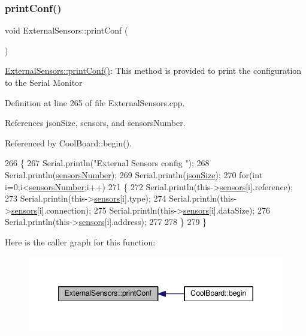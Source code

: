 \subsubsection{\texorpdfstring{print\+Conf()}{printConf()}}
{\footnotesize\ttfamily void External\+Sensors\+::print\+Conf (\begin{DoxyParamCaption}{ }\end{DoxyParamCaption})}

\hyperlink{classExternalSensors_a78c2bf55084435dd51d3c559b2d3c6f3}{External\+Sensors\+::print\+Conf()}\+: This method is provided to print the configuration to the Serial Monitor 

Definition at line 265 of file External\+Sensors.\+cpp.



References json\+Size, sensors, and sensors\+Number.



Referenced by Cool\+Board\+::begin().


\begin{DoxyCode}
266 \{
267     Serial.println(\textcolor{stringliteral}{"External Sensors config "});
268     Serial.println(\hyperlink{classExternalSensors_a58e4fbf9adeae787d92be5fa33043b5d}{sensorsNumber});
269     Serial.println(\hyperlink{classExternalSensors_acacea86d74d967b57fcff282d26cff57}{jsonSize});
270     \textcolor{keywordflow}{for}(\textcolor{keywordtype}{int} i=0;i<\hyperlink{classExternalSensors_a58e4fbf9adeae787d92be5fa33043b5d}{sensorsNumber};i++)
271     \{
272         Serial.println(this->\hyperlink{classExternalSensors_a284233f884fcf00154a44740cf1d9e1e}{sensors}[i].reference);
273         Serial.println(this->\hyperlink{classExternalSensors_a284233f884fcf00154a44740cf1d9e1e}{sensors}[i].type);
274         Serial.println(this->\hyperlink{classExternalSensors_a284233f884fcf00154a44740cf1d9e1e}{sensors}[i].connection);
275         Serial.println(this->\hyperlink{classExternalSensors_a284233f884fcf00154a44740cf1d9e1e}{sensors}[i].dataSize);
276         Serial.println(this->\hyperlink{classExternalSensors_a284233f884fcf00154a44740cf1d9e1e}{sensors}[i].address);
277     
278     \}
279 \}
\end{DoxyCode}
Here is the caller graph for this function\+:
\nopagebreak
\begin{figure}[H]
\begin{center}
\leavevmode
\includegraphics[width=342pt]{classExternalSensors_a78c2bf55084435dd51d3c559b2d3c6f3_icgraph}
\end{center}
\end{figure}
\mbox{\label{classExternalSensors_a53177b81eca3be89508b5511ddcd00fc}} 
